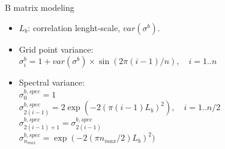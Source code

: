 \documentclass[francais]{beamer}
\begin{document}
\begin{frame}{B matrix modeling}
 \begin{itemize}
  \item $L_b$: correlation lenght-scale, $var(\sigma^b)$.
  \item Grid point variance:\\
  $\sigma^b_i=1+var(\sigma^b)\times \sin(2\pi(i-1)/n), \quad i=1..n$
  \vspace{+0.5cm}
  \item Spectral variance:\\
  $\sigma^{b,spec}_0=1$\\
  $\sigma^{b,spec}_{2(i-1)}=2 \exp(-2(\pi(i-1)L_b)^2), \quad i=1..n/2$\\
  $\sigma^{b,spec}_{2(i-1)+1}=\sigma^{b,spec}_{2(i-1)}$\\
  $\sigma^{b,spec}_{n_{max}}=\exp(-2(\pi n_{max}/2)L_b)^2)$\\
 \end{itemize}
\end{frame}





\usebackgroundtemplate{}
\end{document}
